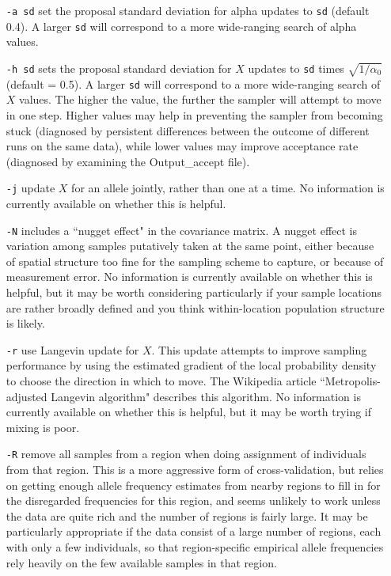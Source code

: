 \documentclass[10pt,titlepage,times,letterpaper]{article}
\begin{document}
\begin{itemize}
\item[{\tt -a sd}] set the proposal standard deviation for alpha updates to
{\tt sd} (default 0.4).  A larger {\tt sd} will correspond to a more
wide-ranging search of alpha values.

\item[{\tt -h sd}] sets the
proposal standard deviation for $X$ updates to {\tt sd} times
$\sqrt{1/\alpha_0}$ (default = 0.5).  A larger {\tt sd} 
will correspond to a 
more wide-ranging search of $X$ values.  The higher the value, the further
the sampler will attempt to move in one step.  Higher values may help
in preventing the sampler from becoming stuck (diagnosed by persistent
differences between the outcome of different runs on the same data), while
lower values may improve acceptance rate (diagnosed by examining the
Output\_accept file).

\item[{\tt -j}] update $X$ for an allele jointly, rather than one at a time.
No information is currently available on whether this is
helpful.

\item[{\tt -N}] includes a ``nugget effect" in the covariance matrix.  
A nugget effect is variation among samples putatively
taken at the same point, either because of spatial structure too fine
for the sampling scheme to capture, or because of measurement error.
No information is currently available on whether this is helpful, but it
may be worth considering particularly if your sample locations are
rather broadly defined and you think within-location population structure
is likely.

\item[{\tt -r}] use Langevin update for $X$.   This 
update attempts to improve sampling performance by using the estimated 
gradient of the local probability density to choose the direction in
which to move.  The Wikipedia article ``Metropolis-adjusted Langevin 
algorithm" describes this algorithm.  No information is currently
available on whether this is helpful, but it may be worth trying if
mixing is poor.

\item[{\tt -R}] remove
all samples from a region when doing assignment of individuals from
that region.  This is a more aggressive form of cross-validation,
but relies on getting enough allele frequency estimates from nearby
regions to fill in for the disregarded frequencies for this region, and
seems unlikely to work unless the data are quite rich and the number of
regions is fairly large.  It may be particularly appropriate if the
data consist of a large number of regions, each with only a few
individuals, so that region-specific empirical allele frequencies rely
heavily on the few available samples in that region.


\end{itemize}
\end{document}
